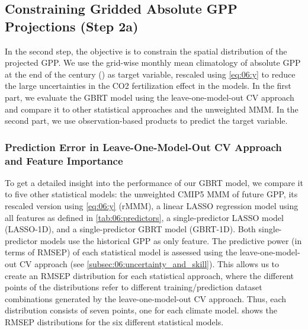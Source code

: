 \subsection{Constraining Gridded Absolute \acs{GPP} Projections (Step 2a)}
\label{subsec:06:results_step2a}

In the second step, the objective is to constrain the spatial distribution of
the projected \ac{GPP}. We use the grid-wise monthly mean climatology of
absolute \ac{GPP} at the end of the  century () as
target variable, rescaled using \cref{eq:06:y} to reduce the large
uncertainties in the \acs{CO2} fertilization effect in the models. In the first
part, we evaluate the GBRT model using the leave-one-model-out \ac{CV} approach
and compare it to other statistical approaches and the unweighted \ac{MMM}. In
the second part, we use observation-based products to predict the target
variable.


\subsubsection{Prediction Error in Leave-One-Model-Out \acs{CV} Approach and
  Feature Importance}
\label{subsubsec:06:results_step2a_ml_inference}

To get a detailed insight into the performance of our \ac{GBRT} model, we
compare it to five other statistical models: the unweighted \acs{CMIP}5
\ac{MMM} of future \ac{GPP}, its rescaled version using \cref{eq:06:y}
(r\acs{MMM}), a linear \ac{LASSO} regression model using all features as
defined in \cref{tab:06:predictors}, a single-predictor \ac{LASSO} model
(\acs{LASSO}-1D), and a single-predictor \ac{GBRT} model (\acs{GBRT}-1D). Both
single-predictor models use the historical \ac{GPP} as only feature. The
predictive power (in terms of \ac{RMSEP}) of each statistical model is assessed
using the leave-one-model-out \ac{CV} approach (see
\cref{subsec:06:uncertainty_and_skill}). This allows us to create an \ac{RMSEP}
distribution for each statistical approach, where the different points of the
distributions refer to different training/prediction dataset combinations
generated by the leave-one-model-out \ac{CV} approach. Thus, each distribution
consists of seven points, one for each climate model.
 shows the \ac{RMSEP} distributions for the
six different statistical models.

